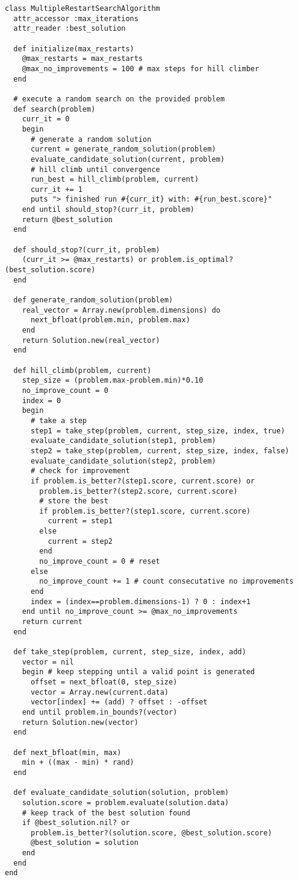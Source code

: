 \begin{lstlisting}
class MultipleRestartSearchAlgorithm
  attr_accessor :max_iterations
  attr_reader :best_solution
  
  def initialize(max_restarts)
    @max_restarts = max_restarts
    @max_no_improvements = 100 # max steps for hill climber
  end
  
  # execute a random search on the provided problem
  def search(problem)    
    curr_it = 0
    begin
      # generate a random solution 
      current = generate_random_solution(problem)
      evaluate_candidate_solution(current, problem)
      # hill climb until convergence
      run_best = hill_climb(problem, current)
      curr_it += 1      
      puts "> finished run #{curr_it} with: #{run_best.score}"   
    end until should_stop?(curr_it, problem)
    return @best_solution
  end
  
  def should_stop?(curr_it, problem)
    (curr_it >= @max_restarts) or problem.is_optimal?(best_solution.score)
  end
  
  def generate_random_solution(problem)
    real_vector = Array.new(problem.dimensions) do
      next_bfloat(problem.min, problem.max)
    end
    return Solution.new(real_vector)
  end
  
  def hill_climb(problem, current)
    step_size = (problem.max-problem.min)*0.10
    no_improve_count = 0
    index = 0
    begin
      # take a step
      step1 = take_step(problem, current, step_size, index, true)
      evaluate_candidate_solution(step1, problem)
      step2 = take_step(problem, current, step_size, index, false)
      evaluate_candidate_solution(step2, problem)      
      # check for improvement
      if problem.is_better?(step1.score, current.score) or 
        problem.is_better?(step2.score, current.score)
        # store the best
        if problem.is_better?(step1.score, current.score)
          current = step1
        else
          current = step2
        end
        no_improve_count = 0 # reset
      else
        no_improve_count += 1 # count consecutative no improvements
      end
      index = (index==problem.dimensions-1) ? 0 : index+1
    end until no_improve_count >= @max_no_improvements
    return current
  end
  
  def take_step(problem, current, step_size, index, add)
    vector = nil
    begin # keep stepping until a valid point is generated
      offset = next_bfloat(0, step_size)
      vector = Array.new(current.data)
      vector[index] += (add) ? offset : -offset
    end until problem.in_bounds?(vector)
    return Solution.new(vector)
  end

  def next_bfloat(min, max)
    min + ((max - min) * rand)
  end
  
  def evaluate_candidate_solution(solution, problem)
    solution.score = problem.evaluate(solution.data)
    # keep track of the best solution found
    if @best_solution.nil? or
      problem.is_better?(solution.score, @best_solution.score)
      @best_solution = solution                  
    end
  end  
end
\end{lstlisting}

